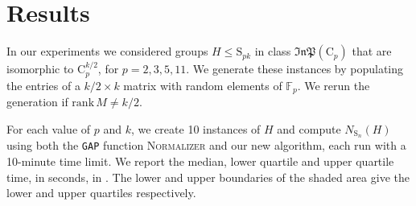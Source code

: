 \documentclass[11pt,a4paper]{article}
\theoremstyle{definition}
\theoremstyle{remark}
\newcommand{\InP}{\mathfrak{InP}}
\newcommand{\Sy}{\mathrm{S}}
\newcommand{\Cy}{\mathrm{C}}
\begin{document}

\section{Results}
\label{section: results}
\label{Cpk result}\label{Dpk result}


In our experiments we considered groups $H \leq \Sy_{pk}$ in class $\InP(\Cy_p)$  that are isomorphic to $\Cy_p^{k/2}$, for {$p = 2,3,5,11$.} 
We generate these instances by populating the entries of a $k/2 \times k$ matrix with random elements of $\mathds{F}_p$. 
We rerun the generation if $\mathrm{rank} \, M \neq k/2$. 


For each value of $p$ and $k$, we create 10 instances of $H$ and compute  $N_{\Sy_n}(H)$ using both the \texttt{GAP} function \textsc{Normalizer} and our new algorithm, each run with a 10-minute time limit. 
We report the median, lower quartile and upper quartile time, in seconds, in . 
The lower and upper boundaries of the shaded area give the lower and upper quartiles respectively. 
\end{document}
